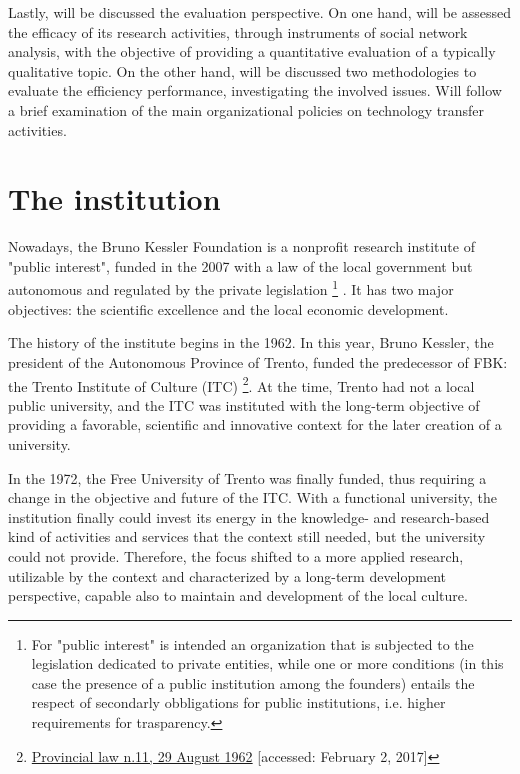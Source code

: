 Lastly, will be discussed the evaluation perspective. On one hand, will be assessed the efficacy of its research activities, through instruments of social network analysis, with the objective of providing a quantitative evaluation of a typically qualitative topic. On the other hand, will be discussed two methodologies to evaluate the efficiency performance, investigating the involved issues. Will follow a brief examination of the main organizational policies on technology transfer activities.

\section{The institution}

Nowadays, the Bruno Kessler Foundation is a nonprofit research institute of "public interest", funded in the 2007 with a law of the local government but autonomous and regulated by the private legislation
\footnote{For "public interest" is intended an organization that is subjected to the legislation dedicated to private entities, while one or more conditions (in this case the presence of a public institution among the founders) entails the respect of secondarly obbligations for public institutions, i.e. higher requirements for trasparency.}
. It has two major objectives: the scientific excellence and the local economic development.

The history of the institute begins in the 1962. In this year, Bruno Kessler, the president of the Autonomous Province of Trento, funded the predecessor of FBK: the Trento Institute of Culture (ITC) 
\footnote{
	\href{http://www.consiglio.provincia.tn.it/leggi-e-archivi/codice-provinciale/archivio/Pages/Legge\%20provinciale\%2029\%20agosto\%201962,\%20n.\%2011_565.aspx}
	{Provincial law n.11, 29 August 1962}
	[accessed: February 2, 2017]
}. 
At the time, Trento had not a local public university, and the ITC was instituted with the long-term objective of providing a favorable, scientific and innovative context for the later creation of a university. 

In the 1972, the Free University of Trento was finally funded, thus requiring a change in the objective and future of the ITC. With a functional university, the institution finally could invest its energy in the knowledge- and research-based kind of activities and services that the context still needed, but the university could not provide. Therefore, the focus shifted to a more applied research, utilizable by the context and characterized by a long-term development perspective, capable also to maintain and development of the local culture.

